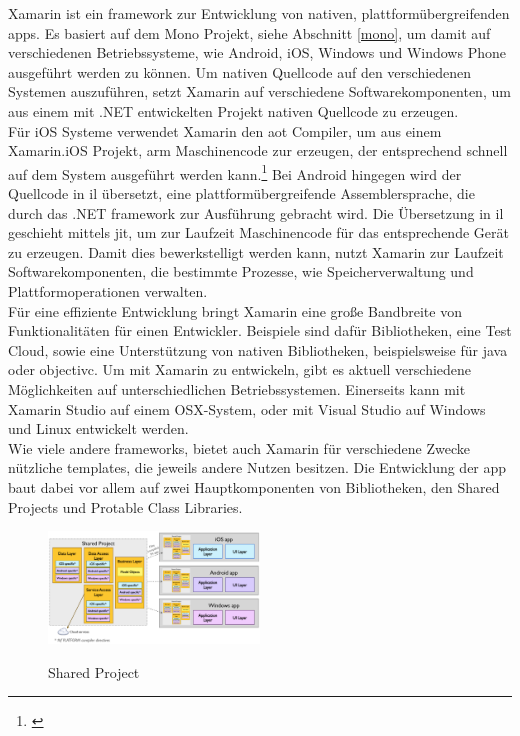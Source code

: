 Xamarin ist ein \gls{framework} zur Entwicklung von nativen, plattformübergreifenden \glspl{app}. Es basiert auf dem Mono Projekt, siehe Abschnitt \eqref{mono}, um damit auf verschiedenen Betriebssysteme, wie Android, iOS, Windows und Windows Phone ausgeführt werden zu können. Um nativen Quellcode auf den verschiedenen Systemen auszuführen, setzt Xamarin auf verschiedene Softwarekomponenten, um aus einem mit .NET entwickelten Projekt nativen Quellcode zu erzeugen.\\
Für iOS Systeme verwendet Xamarin den \gls{aot} Compiler, um aus einem Xamarin.iOS Projekt, \gls{arm} Maschinencode zur erzeugen, der entsprechend schnell auf dem System ausgeführt werden kann.\footnote{\citep[vgl.][Introduction to Mobile Development - Xamarin]{Xamarin.Introductionto}\label{note38}} Bei Android hingegen wird der Quellcode in \gls{il} übersetzt, eine plattformübergreifende Assemblersprache, die durch das .NET \gls{framework} zur Ausführung gebracht wird. Die Übersetzung in \gls{il} geschieht mittels \gls{jit}, um zur Laufzeit Maschinencode für das entsprechende Gerät zu erzeugen. Damit dies bewerkstelligt werden kann, nutzt Xamarin zur Laufzeit Softwarekomponenten, die bestimmte Prozesse, wie Speicherverwaltung und Plattformoperationen verwalten.\\
Für eine effiziente Entwicklung bringt Xamarin eine große Bandbreite von Funktionalitäten für einen Entwickler. Beispiele sind dafür Bibliotheken, eine Test Cloud, sowie eine Unterstützung von nativen Bibliotheken, beispielsweise für \gls{java} oder \gls{objectivc}. Um mit Xamarin zu entwickeln, gibt es aktuell verschiedene Möglichkeiten auf unterschiedlichen Betriebssystemen. Einerseits kann mit Xamarin Studio auf einem OSX-System, oder mit Visual Studio auf Windows und Linux entwickelt werden.\\
Wie viele andere \glspl{framework}, bietet auch Xamarin für verschiedene Zwecke nützliche \glspl{template}, die jeweils andere Nutzen besitzen. Die Entwicklung der \gls{app} baut dabei vor allem auf zwei Hauptkomponenten von Bibliotheken, den Shared Projects und Protable Class Libraries.

\newpage
\begin{figure}
	\begin{center}
		\includegraphics[width=0.5\textwidth]{images/technische_grundlagen/SharedAssetProject.png}
	\end{center}
	\caption{Shared Project}
	\cite{Xamarin.SharedProjects}
	\label{fig:shared}
\end{figure}

